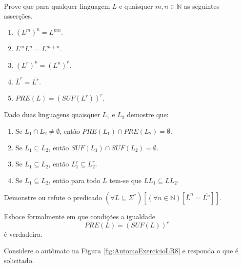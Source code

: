 \begin{exercise}\label{exerc:LR4}
	Prove que para qualquer linguagem $L$ e quaisquer $m,n \in \mathbb{N}$ as seguintes asserções.
\end{exercise}

\begin{enumerate}
	\item $(L^m)^n = L^{mn}$.
	\item $L^mL^n = L^{m+n}$.
	\item $(L^r)^n = (L^n)^r$.
	\item $\overline{L}^r = \overline{L^r}$.
	\item $PRE(L) = (SUF(L^r))^r$.
\end{enumerate}

\begin{exercise}\label{exerc:LR5}
	Dado duas linguagens quaisquer $L_1$ e $L_2$ demostre que:
\end{exercise}

\begin{enumerate}
	\item Se $L_1 \cap L_2 \neq \emptyset$, então $PRE(L_1) \cap PRE(L_2) = \emptyset$.
	\item Se $L_1 \subseteq L_2$, então $SUF(L_1) \cap SUF(L_2) = \emptyset$.
	\item Se $L_1 \subseteq L_2$, então $L_1^r \subseteq L_2^r$.
	\item Se $L_1 \subseteq L_2$, então para todo $L$ tem-se que $LL_1 \subseteq LL_2$. 
\end{enumerate}

\begin{exercise}\label{exerc:LR6}
	Demonstre ou refute o predicado $(\forall L \subseteq \Sigma^*)[(\forall n \in \mathbb{N})[\overline{L}^n = \overline{L^n}]]$.
\end{exercise}

\begin{exercise}\label{exerc:LR7}
	Esboce formalmente em que condições a igualdade 
	$$PRE(L) = (SUF(L))^r$$ 
	é verdadeira.
\end{exercise}

\begin{exercise}\label{exerc:LR8}
	Considere o autômato na Figura \ref{fig:AutomaExercicioLR8} e responda o que é solicitado.
\end{exercise}

